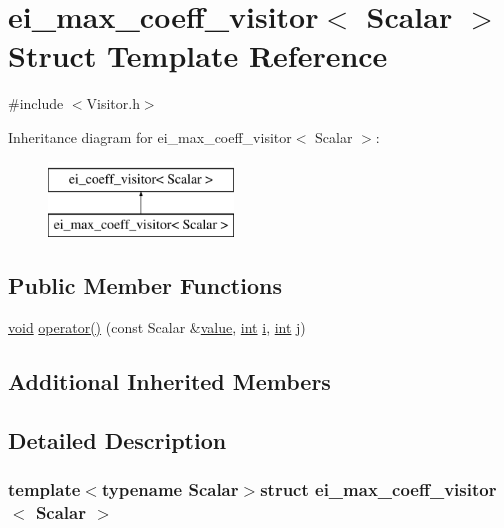 \hypertarget{structei__max__coeff__visitor}{\section{ei\-\_\-max\-\_\-coeff\-\_\-visitor$<$ Scalar $>$ Struct Template Reference}
\label{structei__max__coeff__visitor}
}


{\ttfamily \#include $<$Visitor.\-h$>$}

Inheritance diagram for ei\-\_\-max\-\_\-coeff\-\_\-visitor$<$ Scalar $>$\-:\begin{figure}[H]
\begin{center}
\leavevmode
\includegraphics[height=2.000000cm]{structei__max__coeff__visitor}
\end{center}
\end{figure}
\subsection*{Public Member Functions}
\begin{DoxyCompactItemize}
\item 
\hyperlink{group___u_a_v_objects_plugin_ga444cf2ff3f0ecbe028adce838d373f5c}{void} \hyperlink{structei__max__coeff__visitor_a0fca243849b15d6f97e57fb08b396aff}{operator()} (const Scalar \&\hyperlink{glext_8h_aa0e2e9cea7f208d28acda0480144beb0}{value}, \hyperlink{ioapi_8h_a787fa3cf048117ba7123753c1e74fcd6}{int} \hyperlink{uavobjecttemplate_8m_a6f6ccfcf58b31cb6412107d9d5281426}{i}, \hyperlink{ioapi_8h_a787fa3cf048117ba7123753c1e74fcd6}{int} j)
\end{DoxyCompactItemize}
\subsection*{Additional Inherited Members}


\subsection{Detailed Description}
\subsubsection*{template$<$typename Scalar$>$struct ei\-\_\-max\-\_\-coeff\-\_\-visitor$<$ Scalar $>$}



